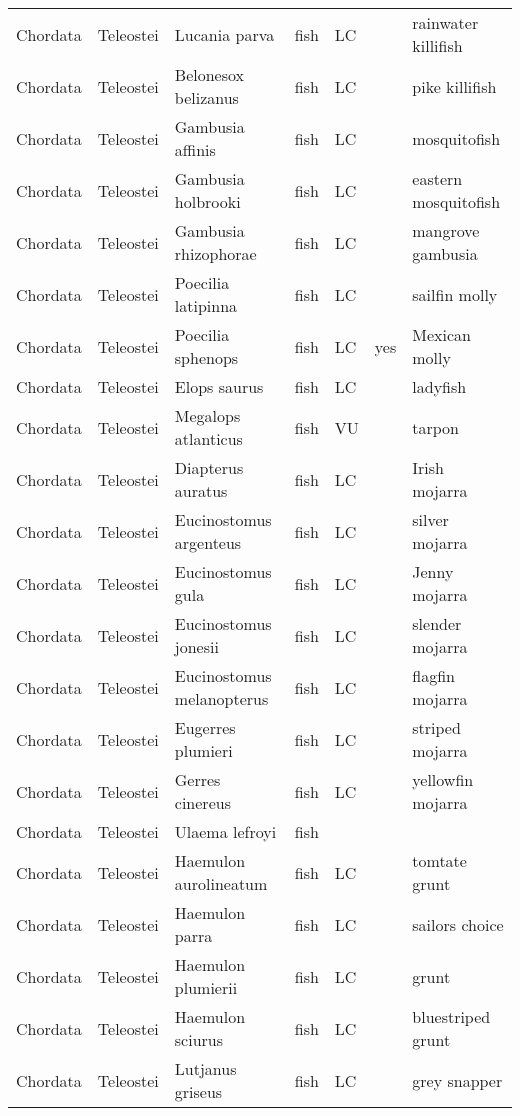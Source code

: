 \begin{longtable}{lllllll}
  Chordata & Teleostei & Lucania parva & fish & LC &  & rainwater killifish \\ 
  Chordata & Teleostei & Belonesox belizanus & fish & LC &  & pike killifish \\ 
  Chordata & Teleostei & Gambusia affinis & fish & LC &  & mosquitofish \\ 
  Chordata & Teleostei & Gambusia holbrooki & fish & LC &  & eastern mosquitofish \\ 
  Chordata & Teleostei & Gambusia rhizophorae & fish & LC &  & mangrove gambusia \\ 
  Chordata & Teleostei & Poecilia latipinna & fish & LC &  & sailfin molly \\ 
  Chordata & Teleostei & Poecilia sphenops & fish & LC & yes & Mexican molly \\ 
  Chordata & Teleostei & Elops saurus & fish & LC &  & ladyfish \\ 
  Chordata & Teleostei & Megalops atlanticus & fish & VU &  & tarpon \\ 
  Chordata & Teleostei & Diapterus auratus & fish & LC &  & Irish mojarra \\ 
  Chordata & Teleostei & Eucinostomus argenteus & fish & LC &  & silver mojarra \\ 
  Chordata & Teleostei & Eucinostomus gula & fish & LC &  & Jenny mojarra \\ 
  Chordata & Teleostei & Eucinostomus jonesii & fish & LC &  & slender mojarra \\ 
  Chordata & Teleostei & Eucinostomus melanopterus & fish & LC &  & flagfin mojarra \\ 
  Chordata & Teleostei & Eugerres plumieri & fish & LC &  & striped mojarra \\ 
  Chordata & Teleostei & Gerres cinereus & fish & LC &  & yellowfin mojarra \\ 
  Chordata & Teleostei & Ulaema lefroyi & fish &  &  &  \\ 
  Chordata & Teleostei & Haemulon aurolineatum & fish & LC &  & tomtate grunt \\ 
  Chordata & Teleostei & Haemulon parra & fish & LC &  & sailors choice \\ 
  Chordata & Teleostei & Haemulon plumierii & fish & LC &  & grunt \\ 
  Chordata & Teleostei & Haemulon sciurus & fish & LC &  & bluestriped grunt \\ 
  Chordata & Teleostei & Lutjanus griseus & fish & LC &  & grey snapper \\ 

\end{longtable}
